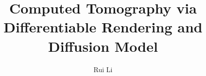\documentclass[lettersize,journal,onecolumn]{IEEEtran}
\begin{document}
\title{Computed Tomography via Differentiable Rendering and Diffusion Model}

\author{Rui Li}



\maketitle

\def\eg{\emph{e.g.}}
\def\Eg{\emph{E.g.}}
\def\etal{\emph{et al.}}

\newcommand\todo[1]{{\color{orange}TODO: #1}}
\newcommand\revised[1]{{\color{red}#1}}
\newcommand\idea[1]{{\color{blue}IDEA:#1}}
\newcommand\eqnref[1]{Eqn.~(\ref{#1})}
\newcommand\figref[1]{Fig.~(\ref{#1})}
\newcommand\secref[1]{Sec.~\ref{#1}}
\newcommand\tabref[1]{Tab.~\ref{#1}}

\newcommand{\T}{\mathbf{T}}
\newcommand{\svl}{\hat{\mathbf{s}}} %
\newcommand{\svg}{\mathbf{s}} %
\newcommand{\svt}{\mathbf{S}} %
\newcommand\mm[1]{\mathcal{#1}}
\newcommand\sv[1]{\mathcal{#1}}
\newcommand{\note}[1]{{\em{\textcolor{orange}{#1}}}}

\begin{abstract}
\end{abstract}



%
%

%



%
%
%
%
%
%
%
%
%
%
%	
%	
\vfill
\end{document}
